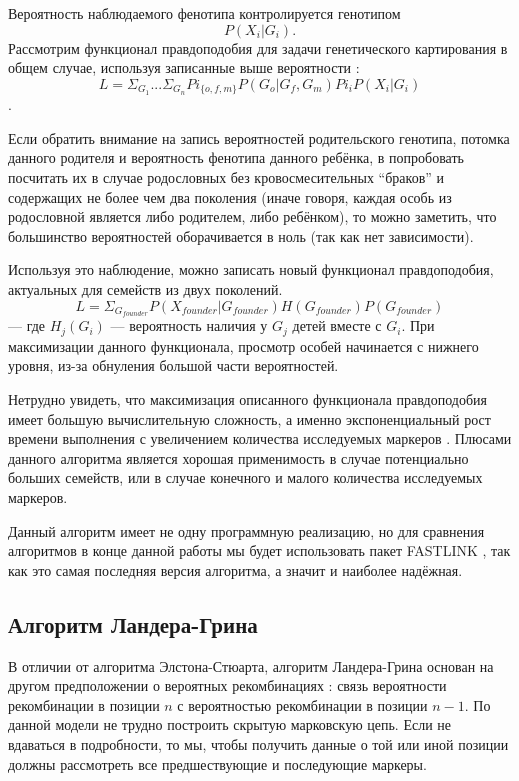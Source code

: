 \documentclass{matmex-diploma-custom}
\begin{document}
Вероятность наблюдаемого фенотипа контролируется генотипом $$P(X_{i} |
G_{i}).$$ Рассмотрим функционал правдоподобия для задачи генетического
картирования в общем случае, используя записанные выше вероятности
\cite{elston1971general}: $$L =
\Sigma_{G_{1}}...\Sigma_{G_{n}}Pi_{\{o,f,m\}}P(G_{o} | G_{f}, G_{m})
Pi_{i}P(X_{i} | G_{i})$$.

Если обратить внимание на запись вероятностей родительского генотипа,
потомка данного родителя и вероятность фенотипа данного ребёнка, в
попробовать посчитать их в случае родословных без кровосмесительных
``браков'' и содержащих не более чем два поколения (иначе говоря,
каждая особь из родословной является либо родителем, либо ребёнком),
то можно заметить, что большинство вероятностей оборачивается в ноль
(так как нет зависимости).

Используя это наблюдение, можно записать новый функционал
правдоподобия, актуальных для семейств из двух поколений.$$L =
\Sigma_{G_{founder}}P(X_{founder}|G_{founder})H(G_{founder})P(G_{founder})$$
--- где $H_{j}(G_{i})$ --- вероятность наличия у $G_{j}$ детей вместе
с $G_{i}$. При максимизации данного функционала, просмотр особей
начинается с нижнего уровня, из-за обнуления большой части
вероятностей.

Нетрудно увидеть, что максимизация описанного функционала
правдоподобия имеет большую вычислительную сложность, а именно
экспоненциальный рост времени выполнения с увеличением количества
исследуемых маркеров \cite{fishelson2002exact}. Плюсами данного
алгоритма является хорошая применимость в случае потенциально больших
семейств, или в случае конечного и малого количества исследуемых
маркеров.

Данный алгоритм имеет не одну программную реализацию, но для сравнения
алгоритмов в конце данной работы мы будет использовать пакет FASTLINK
\cite{faslinkUrl}, так как это самая последняя версия алгоритма, а
значит и наиболее надёжная.

\subsection{Алгоритм Ландера-Грина}

В отличии от алгоритма Элстона-Стюарта, алгоритм Ландера-Грина основан
на другом предположении о вероятных рекомбинациях
\cite{lander1987construction}: связь вероятности рекомбинации в
позиции $n$ с вероятностью рекомбинации в позиции $n-1$. По данной
модели не трудно построить скрытую марковскую цепь. Если не вдаваться
в подробности, то мы, чтобы получить данные о той или иной позиции
должны рассмотреть все предшествующие и последующие маркеры.
\end{document}
